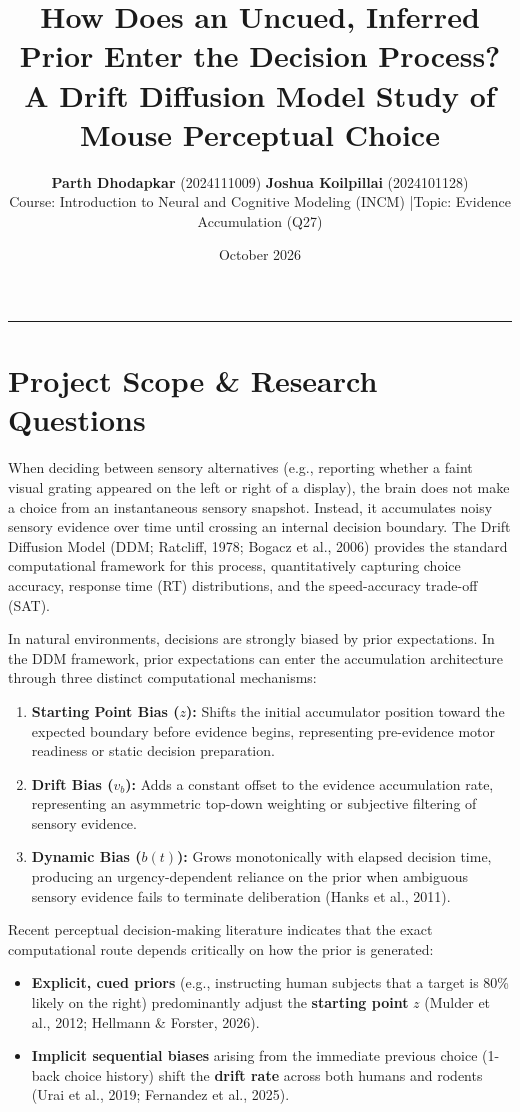 \documentclass[10pt,a4paper]{article}
\title{\textbf{\Large How Does an Uncued, Inferred Prior Enter the Decision Process?}\\[0.3em]
\large A Drift Diffusion Model Study of Mouse Perceptual Choice}
\author{\textbf{Parth Dhodapkar} (2024111009) \quad \textbf{Joshua Koilpillai} (2024101128)\\[0.2em]
\normalsize Course: Introduction to Neural and Cognitive Modeling (INCM) \quad|\quad Topic: Evidence Accumulation (Q27)}
\date{\vspace{-1.5em}\small October 2026}
\begin{document}
\maketitle

\vspace{-1.5em}
\hrule
\vspace{0.8em}

\section{Project Scope \& Research Questions}

When deciding between sensory alternatives (e.g., reporting whether a faint visual grating appeared on the left or right of a display), the brain does not make a choice from an instantaneous sensory snapshot. Instead, it accumulates noisy sensory evidence over time until crossing an internal decision boundary. The Drift Diffusion Model (DDM; Ratcliff, 1978; Bogacz et al., 2006) provides the standard computational framework for this process, quantitatively capturing choice accuracy, response time (RT) distributions, and the speed-accuracy trade-off (SAT).

In natural environments, decisions are strongly biased by prior expectations. In the DDM framework, prior expectations can enter the accumulation architecture through three distinct computational mechanisms:
\begin{enumerate}
    \item \textbf{Starting Point Bias ($z$):} Shifts the initial accumulator position toward the expected boundary before evidence begins, representing pre-evidence motor readiness or static decision preparation.
    \item \textbf{Drift Bias ($v_b$):} Adds a constant offset to the evidence accumulation rate, representing an asymmetric top-down weighting or subjective filtering of sensory evidence.
    \item \textbf{Dynamic Bias ($b(t)$):} Grows monotonically with elapsed decision time, producing an urgency-dependent reliance on the prior when ambiguous sensory evidence fails to terminate deliberation (Hanks et al., 2011).
\end{enumerate}

Recent perceptual decision-making literature indicates that the exact computational route depends critically on how the prior is generated:
\begin{itemize}
    \item \textbf{Explicit, cued priors} (e.g., instructing human subjects that a target is 80\% likely on the right) predominantly adjust the \textbf{starting point} $z$ (Mulder et al., 2012; Hellmann \& Forster, 2026).
    \item \textbf{Implicit sequential biases} arising from the immediate previous choice (1-back choice history) shift the \textbf{drift rate} across both humans and rodents (Urai et al., 2019; Fernandez et al., 2025).
\end{itemize}
\end{document}
